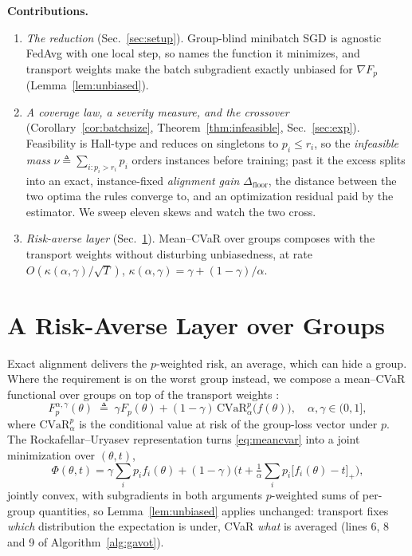 \documentclass{article}
\theoremstyle{definition}
\newcommand{\CVaR}{\mathrm{CVaR}}
\begin{document}
\noindent\textbf{Contributions.}
\begin{enumerate}\itemsep0pt\parskip0pt
\item \emph{The reduction} (Sec.~\ref{sec:setup}). Group-blind minibatch SGD is
agnostic \textsf{FedAvg} with one local step, so \cite{rahimi2025agnostic} names
the function it minimizes, and transport weights make the batch subgradient
exactly unbiased for $\nabla F_p$ (Lemma~\ref{lem:unbiased}).
\item \emph{A coverage law, a severity measure, and the crossover}
(Corollary~\ref{cor:batchsize}, Theorem~\ref{thm:infeasible}, Sec.~\ref{sec:exp}).
Feasibility is Hall-type and reduces on singletons to $p_i\le r_i$, so the
\emph{infeasible mass} $\nu\triangleq\sum_{i:p_i>r_i}p_i$ orders instances
before training; past it the excess splits into an exact, instance-fixed
\emph{alignment gain} $\Delta_{\mathrm{floor}}$, the distance between the two
optima the rules converge to, and an optimization residual paid by the
estimator. We sweep eleven skews and watch the two cross.
\item \emph{Risk-averse layer} (Sec.~\ref{sec:cvar}). Mean--CVaR over groups
composes with the transport weights without disturbing unbiasedness, at rate
$O(\kappa(\alpha,\gamma)/\sqrt{T})$,
$\kappa(\alpha,\gamma)=\gamma+(1-\gamma)/\alpha$.
\end{enumerate}




\section{A Risk-Averse Layer over Groups}
\label{sec:cvar}

Exact alignment delivers the $p$-weighted risk, an average, which can hide a
group. Where the requirement is on the worst group instead, we compose a
mean--CVaR functional over groups on top of the transport weights
\cite{rahimi2025agnostic,rockafellar2000cvar,theodoropoulos2024restricted}:
\begin{equation}
F_p^{\alpha,\gamma}(\theta)\;\triangleq\;\gamma F_p(\theta)+(1-\gamma)\,
\CVaR^p_\alpha\big(f(\theta)\big),\quad \alpha,\gamma\in(0,1],
\label{eq:meancvar}
\end{equation}
where $\CVaR^p_\alpha$ is the conditional value at risk of the group-loss vector
under $p$. The Rockafellar--Uryasev representation turns \eqref{eq:meancvar}
into a joint minimization over $(\theta,t)$,
\begin{equation}
\Phi(\theta,t)=\gamma\sum_i p_i f_i(\theta)+(1-\gamma)\Big(t+\tfrac{1}{\alpha}
\sum_i p_i\big[f_i(\theta)-t\big]_+\Big),
\label{eq:ru}
\end{equation}
jointly convex, with subgradients in both arguments $p$-weighted sums of
per-group quantities, so Lemma~\ref{lem:unbiased} applies unchanged: transport
fixes \emph{which} distribution the expectation is under, CVaR \emph{what} is
averaged (lines 6, 8 and 9 of Algorithm~\ref{alg:gavot}).
\end{document}

